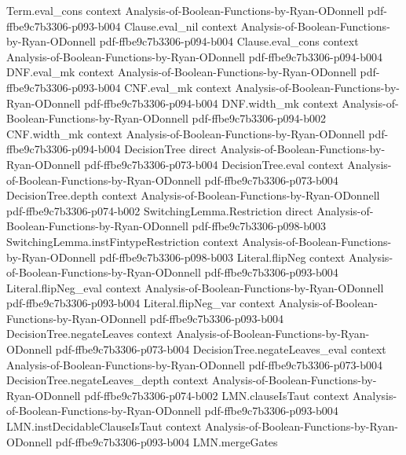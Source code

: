 \begin{lemma}
\proofstep
  {Term.eval_cons}
  {context}
  {Analysis-of-Boolean-Functions-by-Ryan-ODonnell}
  {pdf-ffbe9c7b3306-p093-b004}
\proofstep
  {Clause.eval_nil}
  {context}
  {Analysis-of-Boolean-Functions-by-Ryan-ODonnell}
  {pdf-ffbe9c7b3306-p094-b004}
\proofstep
  {Clause.eval_cons}
  {context}
  {Analysis-of-Boolean-Functions-by-Ryan-ODonnell}
  {pdf-ffbe9c7b3306-p094-b004}
\proofstep
  {DNF.eval_mk}
  {context}
  {Analysis-of-Boolean-Functions-by-Ryan-ODonnell}
  {pdf-ffbe9c7b3306-p093-b004}
\proofstep
  {CNF.eval_mk}
  {context}
  {Analysis-of-Boolean-Functions-by-Ryan-ODonnell}
  {pdf-ffbe9c7b3306-p094-b004}
\proofstep
  {DNF.width_mk}
  {context}
  {Analysis-of-Boolean-Functions-by-Ryan-ODonnell}
  {pdf-ffbe9c7b3306-p094-b002}
\proofstep
  {CNF.width_mk}
  {context}
  {Analysis-of-Boolean-Functions-by-Ryan-ODonnell}
  {pdf-ffbe9c7b3306-p094-b004}
\proofstep
  {DecisionTree}
  {direct}
  {Analysis-of-Boolean-Functions-by-Ryan-ODonnell}
  {pdf-ffbe9c7b3306-p073-b004}
\proofstep
  {DecisionTree.eval}
  {context}
  {Analysis-of-Boolean-Functions-by-Ryan-ODonnell}
  {pdf-ffbe9c7b3306-p073-b004}
\proofstep
  {DecisionTree.depth}
  {context}
  {Analysis-of-Boolean-Functions-by-Ryan-ODonnell}
  {pdf-ffbe9c7b3306-p074-b002}
\proofstep
  {SwitchingLemma.Restriction}
  {direct}
  {Analysis-of-Boolean-Functions-by-Ryan-ODonnell}
  {pdf-ffbe9c7b3306-p098-b003}
\proofstep
  {SwitchingLemma.instFintypeRestriction}
  {context}
  {Analysis-of-Boolean-Functions-by-Ryan-ODonnell}
  {pdf-ffbe9c7b3306-p098-b003}
\proofstep
  {Literal.flipNeg}
  {context}
  {Analysis-of-Boolean-Functions-by-Ryan-ODonnell}
  {pdf-ffbe9c7b3306-p093-b004}
\proofstep
  {Literal.flipNeg_eval}
  {context}
  {Analysis-of-Boolean-Functions-by-Ryan-ODonnell}
  {pdf-ffbe9c7b3306-p093-b004}
\proofstep
  {Literal.flipNeg_var}
  {context}
  {Analysis-of-Boolean-Functions-by-Ryan-ODonnell}
  {pdf-ffbe9c7b3306-p093-b004}
\proofstep
  {DecisionTree.negateLeaves}
  {context}
  {Analysis-of-Boolean-Functions-by-Ryan-ODonnell}
  {pdf-ffbe9c7b3306-p073-b004}
\proofstep
  {DecisionTree.negateLeaves_eval}
  {context}
  {Analysis-of-Boolean-Functions-by-Ryan-ODonnell}
  {pdf-ffbe9c7b3306-p073-b004}
\proofstep
  {DecisionTree.negateLeaves_depth}
  {context}
  {Analysis-of-Boolean-Functions-by-Ryan-ODonnell}
  {pdf-ffbe9c7b3306-p074-b002}
\proofstep
  {LMN.clauseIsTaut}
  {context}
  {Analysis-of-Boolean-Functions-by-Ryan-ODonnell}
  {pdf-ffbe9c7b3306-p093-b004}
\proofstep
  {LMN.instDecidableClauseIsTaut}
  {context}
  {Analysis-of-Boolean-Functions-by-Ryan-ODonnell}
  {pdf-ffbe9c7b3306-p093-b004}
\proofstep
  {LMN.mergeGates}

\end{lemma}
